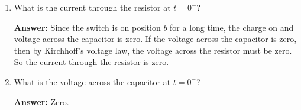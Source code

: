 \documentclass{article}
\begin{document}
\begin{enumerate}

  \item What is the current through the resistor at $t=0^-$?

        \ifsolutions
        {\bf Answer: } Since the switch is on position $b$ for a long time, the charge on and voltage across the capacitor is zero. If the voltage across the capacitor is zero, then by Kirchhoff's voltage law, the voltage across the resistor must be zero. So the current through the resistor is zero.
        \else
        \vskip 56.25pt
        \fi
        \ifsolutions\else
        \vskip 56.25pt
        \fi

  \item What is the voltage across the capacitor at $t=0^-$?

        \ifsolutions
        {\bf Answer: } Zero.
        \else
        \vskip 56.25pt
        \fi
        \ifsolutions\else
        \vskip 56.25pt
        \fi

\end{enumerate}
\end{document}
